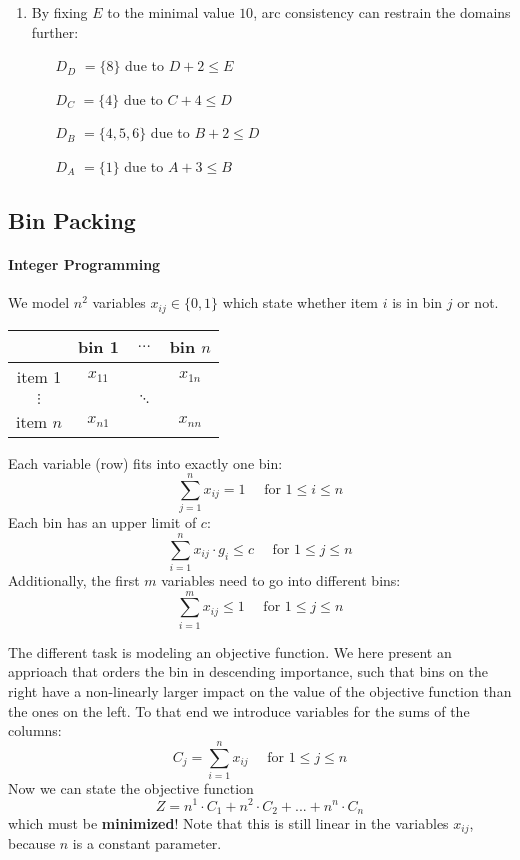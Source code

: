 \documentclass[a4paper, oneside]{scrartcl}
\begin{document}
\begin{enumerate}
\item By fixing $E$ to the minimal value $10$, arc consistency can restrain the domains further:

\begin{itemize}
\item[$D_D$] $ = \{8\}$ due to $D + 2 \leq E$
\item[$D_C$] $ = \{4\}$ due to $C + 4 \leq D$
\item[$D_B$] $ = \{4, 5, 6\}$ due to $B + 2 \leq D$
\item[$D_A$] $ = \{1\}$ due to $A + 3 \leq B$
\end{itemize}
 
    
\end{enumerate}


\subsection{Bin Packing}

\paragraph{Integer Programming}
We model $n^2$ variables $x_{ij} \in \{0,1\}$ which state whether item $i$ is in bin $j$ or not.

\begin{table}[hbt]
\begin{tabular}{|c|ccc|}
\hline
         & bin 1    & $\hdots$ & bin $n$  \\ \hline
item 1   & $x_{11}$ &          & $x_{1n}$ \\ 
$\vdots$ &          & $\ddots$ &          \\ 
item $n$ & $x_{n1}$ &          & $x_{nn}$ \\ \hline
\end{tabular}\end{table}

\noindent Each variable (row) fits into exactly one bin:
\[ \sum_{j=1}^n x_{ij} = 1 \quad \text{ for } 1 \leq i \leq n \]
Each bin has an upper limit of $c$:
\[ \sum_{i=1}^n x_{ij}\cdot g_i \leq c \quad \text{ for } 1 \leq j \leq n \]
Additionally, the first $m$ variables need to go into different bins:
\[ \sum_{i=1}^m x_{ij} \leq 1 \quad \text{ for } 1 \leq j \leq n \]

The different task is modeling an objective function. We here present an apprioach that 
orders the bin in descending importance, such that bins on the right have a non-linearly 
larger impact on the value of the objective function than the ones on the left. To that end 
we introduce variables for the sums of the columns:
\[ C_j = \sum_{i=1}^n x_{ij} \quad \text{ for } 1 \leq j \leq n \]
Now we can state the objective function
\[ Z = n^1 \cdot C_1 + n^2 \cdot C_2 + ... + n^n \cdot C_n \]
which must be \textbf{minimized}!
Note that this is still linear in the variables $x_{ij}$, because $n$ is a constant parameter.
\end{document}
